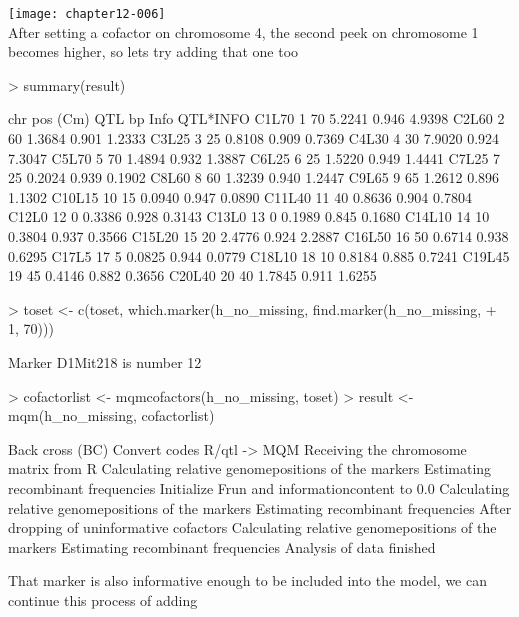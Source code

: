 \documentclass[a4paper]{article}
\begin{document}
\texttt{[image: chapter12-006]}
\\
After setting a cofactor on chromosome 4, the second peek on chromosome 1 becomes higher, so lets try adding that one too
\\
\begin{Schunk}
\begin{Sinput}
> summary(result)
\end{Sinput}
\begin{Soutput}
       chr pos (Cm) QTL bp  Info QTL*INFO
C1L70    1       70 5.2241 0.946   4.9398
C2L60    2       60 1.3684 0.901   1.2333
C3L25    3       25 0.8108 0.909   0.7369
C4L30    4       30 7.9020 0.924   7.3047
C5L70    5       70 1.4894 0.932   1.3887
C6L25    6       25 1.5220 0.949   1.4441
C7L25    7       25 0.2024 0.939   0.1902
C8L60    8       60 1.3239 0.940   1.2447
C9L65    9       65 1.2612 0.896   1.1302
C10L15  10       15 0.0940 0.947   0.0890
C11L40  11       40 0.8636 0.904   0.7804
C12L0   12        0 0.3386 0.928   0.3143
C13L0   13        0 0.1989 0.845   0.1680
C14L10  14       10 0.3804 0.937   0.3566
C15L20  15       20 2.4776 0.924   2.2887
C16L50  16       50 0.6714 0.938   0.6295
C17L5   17        5 0.0825 0.944   0.0779
C18L10  18       10 0.8184 0.885   0.7241
C19L45  19       45 0.4146 0.882   0.3656
C20L40  20       40 1.7845 0.911   1.6255
\end{Soutput}
\begin{Sinput}
> toset <- c(toset, which.marker(h_no_missing, find.marker(h_no_missing, 
+     1, 70)))
\end{Sinput}
\begin{Soutput}
Marker D1Mit218 is number 12 
\end{Soutput}
\begin{Sinput}
> cofactorlist <- mqmcofactors(h_no_missing, toset)
> result <- mqm(h_no_missing, cofactorlist)
\end{Sinput}
\begin{Soutput}
Back cross (BC)
Convert codes R/qtl -> MQM
Receiving the chromosome matrix from R
Calculating relative genomepositions of the markers
Estimating recombinant frequencies
Initialize Frun and informationcontent to 0.0
Calculating relative genomepositions of the markers
Estimating recombinant frequencies
After dropping of uninformative cofactors
Calculating relative genomepositions of the markers
Estimating recombinant frequencies
Analysis of data finished
\end{Soutput}
\end{Schunk}
That marker is also informative enough to be included into the model, we can continue this process of adding
\end{document}
